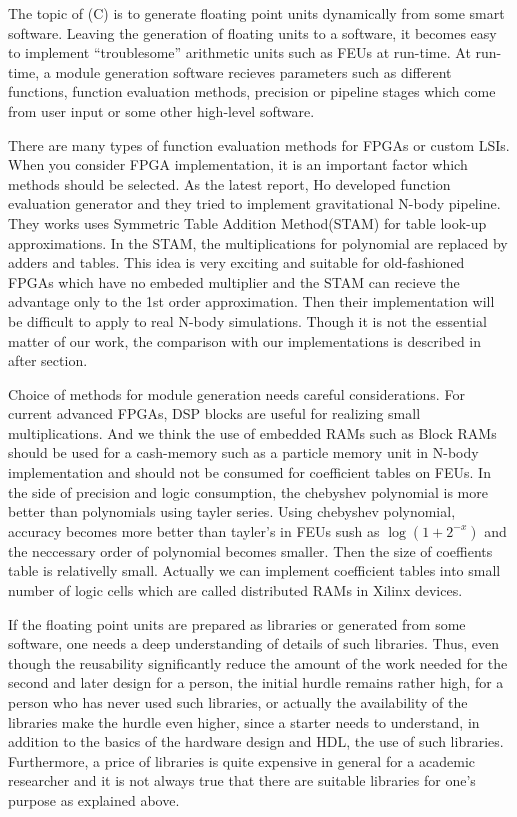 \documentclass{llncs}
\begin{document}
The topic of (C) is to generate floating point units dynamically from
some smart software.  Leaving the generation of floating units to a
software, it becomes easy to implement ``troublesome'' arithmetic
units such as FEUs at run-time.  At run-time, a module generation
software recieves parameters such as different functions, function
evaluation methods, precision or pipeline stages which come from user
input or some other high-level software.

There are many types of function evaluation methods for FPGAs or
custom LSIs.  When you consider FPGA implementation, it is an
important factor which methods should be selected.  As the latest
report, Ho\cite{HTYLL03} developed function evaluation generator and
they tried to implement gravitational N-body pipeline.  They works
uses Symmetric Table Addition Method(STAM)\cite{SS99} for table
look-up approximations. In the STAM, the multiplications for polynomial
are replaced by adders and tables. This idea is very exciting and
suitable for old-fashioned FPGAs which have no embeded multiplier and
the STAM can recieve the advantage only to the 1st order
approximation.  Then their implementation will be difficult to apply
to real N-body simulations.  Though it is not the essential matter of
our work, the comparison with our implementations is described in
after section.

Choice of methods for module generation needs careful considerations.
For current advanced FPGAs, DSP blocks are useful for realizing small
multiplications.  And we think the use of embedded RAMs such as Block
RAMs should be used for a cash-memory such as a particle memory unit
in N-body implementation and should not be consumed for coefficient
tables on FEUs.  In the side of precision and logic consumption, the
chebyshev polynomial is more better than polynomials using tayler
series. Using chebyshev polynomial, accuracy becomes more better than
tayler's in FEUs sush as $\log(1+2^{-x})$ and the neccessary order of
polynomial becomes smaller.  Then the size of coeffients table is
relativelly small. Actually we can implement coefficient tables into
small number of logic cells which are called distributed RAMs in
Xilinx devices.

If the floating point units are prepared as libraries or generated
from some software, one needs a deep understanding of details of such
libraries.  Thus, even though the reusability significantly reduce the
amount of the work needed for the second and later design for a
person, the initial hurdle remains rather high, for a person who has
never used such libraries, or actually the availability of the
libraries make the hurdle even higher, since a starter needs to
understand, in addition to the basics of the hardware design and HDL,
the use of such libraries.  Furthermore, a price of libraries is quite
expensive in general for a academic researcher and it is not always
true that there are suitable libraries for one's purpose as explained
above.
\end{document}
